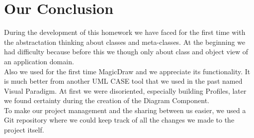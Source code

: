 \chapter{\textbf{Our Conclusion}}

During the development of this homework we have faced for the first time with the abstractation thinking about classes and meta-classes. At the beginning we had difficulty because before this we though only about class and object view of an application domain. 
\\Also we used for the first time MagicDraw and we appreciate its functionality. It is much better from another UML CASE tool that we used in the past named Visual Paradigm. At first we were disoriented, especially building Profiles, later we found certainty during the creation of the Diagram Component.
\\To make our project management and the sharing between us easier, we used a Git repository where we could keep track of all the changes we made to the project itself.